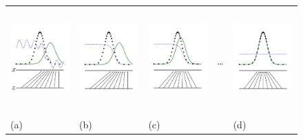 \documentclass{article} %
\begin{document}
\begin{figure}[h]
\begin{tabular}{m{3cm}m{3cm}m{3cm}m{0.1cm}m{3cm}}
    \includegraphics[width=3cm, height=4cm]{fig1.pdf} 
    &  
    \includegraphics[width=3cm, height=4cm]{fig2.pdf}
    & 
    \includegraphics[width=3cm, height=4cm]{fig3.pdf}
    &
    \dots
    &
    \includegraphics[width=3cm, height=4cm]{fig4.pdf}
    \\
    \centering (a)
    & 
    \centering (b) 
    & 
    \centering (c) 
    &  
    & 
    \centering (d)
\end{tabular}


\end{figure}
\end{document}
